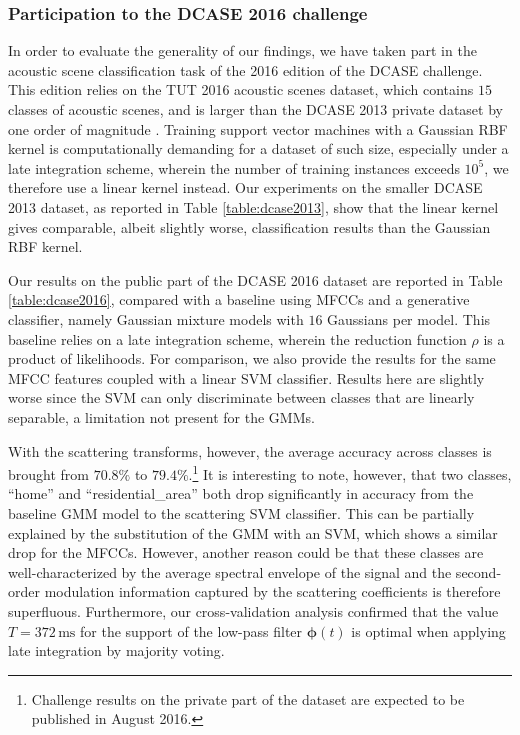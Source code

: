\documentclass[journal]{IEEEtran}
\begin{document}
\subsubsection*{Participation to the DCASE 2016 challenge}
In order to evaluate the generality of our findings, we have taken part in the acoustic scene classification task of the 2016 edition of the DCASE challenge.
This edition relies on the TUT 2016 acoustic scenes dataset, which contains $15$ classes of acoustic scenes, and is larger than the DCASE 2013 private dataset by one order of magnitude \cite{Mesaros2016_EUSIPCO}.
Training support vector machines with a Gaussian RBF kernel is computationally demanding for a dataset of such size, especially under a late integration scheme, wherein the number of training instances exceeds $10^5$, we therefore use a linear kernel instead.
Our experiments on the smaller DCASE 2013 dataset, as reported in Table \ref{table:dcase2013}, show that the linear kernel gives comparable, albeit slightly worse, classification results than the Gaussian RBF kernel.

Our results on the public part of the DCASE 2016 dataset are reported in Table \ref{table:dcase2016}, compared with a baseline using MFCCs and a generative classifier, namely Gaussian mixture models with $16$ Gaussians per model. This baseline relies on a late integration scheme, wherein the reduction function $\rho$ is a product of likelihoods. For comparison, we also provide the results for the same MFCC features coupled with a linear SVM classifier. Results here are slightly worse since the SVM can only discriminate between classes that are linearly separable, a limitation not present for the GMMs.

With the scattering transforms, however, the average accuracy across classes is brought from $70.8\%$ to $79.4\%$.\footnote{Challenge results on the private part of the dataset are expected to be published in August 2016.} It is interesting to note, however, that two classes, ``home'' and ``residential\_area'' both drop significantly in accuracy from the baseline GMM model to the scattering SVM classifier. This can be partially explained by the substitution of the GMM with an SVM, which shows a similar drop for the MFCCs. However, another reason could be that these classes are well-characterized by the average spectral envelope of the signal and the second-order modulation information captured by the scattering coefficients is therefore superfluous.
Furthermore, our cross-validation analysis confirmed that the value $T=372\,\mathrm{ms}$ for the support of the low-pass filter $\boldsymbol{\phi}(t)$ is optimal when applying late integration by majority voting.
\end{document}
